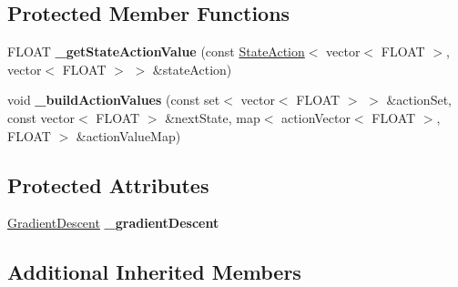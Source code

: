 \subsection*{Protected Member Functions}
\begin{DoxyCompactItemize}
\item 
\hypertarget{classAI_1_1Algorithm_1_1ReinforcementLearningGD_ae03c74aee807bbf220c7e330666e3318}{F\-L\-O\-A\-T {\bfseries \-\_\-get\-State\-Action\-Value} (const \hyperlink{classAI_1_1StateAction}{State\-Action}$<$ vector$<$ F\-L\-O\-A\-T $>$, vector$<$ F\-L\-O\-A\-T $>$ $>$ \&state\-Action)}\label{classAI_1_1Algorithm_1_1ReinforcementLearningGD_ae03c74aee807bbf220c7e330666e3318}

\item 
\hypertarget{classAI_1_1Algorithm_1_1ReinforcementLearningGD_a37eb184f5219dce30af3f60f1835999e}{void {\bfseries \-\_\-build\-Action\-Values} (const set$<$ vector$<$ F\-L\-O\-A\-T $>$ $>$ \&action\-Set, const vector$<$ F\-L\-O\-A\-T $>$ \&next\-State, map$<$ action\-Vector$<$ F\-L\-O\-A\-T $>$, F\-L\-O\-A\-T $>$ \&action\-Value\-Map)}\label{classAI_1_1Algorithm_1_1ReinforcementLearningGD_a37eb184f5219dce30af3f60f1835999e}

\end{DoxyCompactItemize}
\subsection*{Protected Attributes}
\begin{DoxyCompactItemize}
\item 
\hypertarget{classAI_1_1Algorithm_1_1ReinforcementLearningGD_a881c614b3deb26f39683386a72b76dda}{\hyperlink{classAI_1_1Algorithm_1_1GradientDescent}{Gradient\-Descent} {\bfseries \-\_\-gradient\-Descent}}\label{classAI_1_1Algorithm_1_1ReinforcementLearningGD_a881c614b3deb26f39683386a72b76dda}

\end{DoxyCompactItemize}
\subsection*{Additional Inherited Members}


